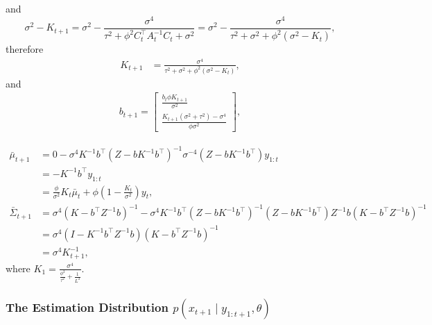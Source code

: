 and
\begin{equation*}
\sigma^2-K_{t+1} = \sigma^2 - \frac{\sigma^4}{\tau^2+\phi^2C_t^\top A_{t}^{-1}C_t+\sigma^2} = \sigma^2 - \frac{\sigma^4}{\tau^2+\sigma^2+\phi^2(\sigma^2-K_t)},
\end{equation*}
therefore
\begin{align}
K_{t+1}  &=\frac{\sigma^4}{\tau^2+\sigma^2+\phi^2(\sigma^2-K_t)},
\end{align}
and
\begin{align}b_{t+1} = 
\begin{bmatrix}
\frac{b_t\phi K_{t+1}}{\sigma^2} \\ \frac{K_{t+1}(\sigma^2+\tau^2)-\sigma^4 }{\phi\sigma^2}
\end{bmatrix},
\end{align}

\begin{align*}
\bar{\mu}_{t+1}      &= 0-\sigma^4 K^{-1}b^\top (Z-bK^{-1}b^\top)^{-1} \sigma^{-4} (Z-bK^{-1}b^\top) y_{1:t} \\
					 & =-K^{-1}b^\top y_{1:t} \\
					 & = \frac{\phi}{\sigma^2}K_t\bar{\mu}_t + \phi (1 - \frac{K_t}{\sigma^2})y_t, \\
\bar{\Sigma}_{t+1} &= \sigma^4(K-b^\top Z^{-1}b)^{-1}- \sigma^4K^{-1}b^\top (Z-bK^{-1}b^\top)^{-1} (Z-bK^{-1}b^\top)Z^{-1}b(K-b^\top Z^{-1}b)^{-1}\\
                     & = \sigma^4(I-K^{-1}b^\top Z^{-1}b)(K-b^\top Z^{-1}b)^{-1} \\
                     & = \sigma^4K_{t+1}^{-1},
\end{align*}
where $K_1=\frac{\sigma^4}{\frac{\phi^2}{\tau^2}+\frac{1}{L^2}}$.



\subsubsection{The Estimation Distribution $p(x_{t+1}\mid y_{1:t+1},\theta)$}

